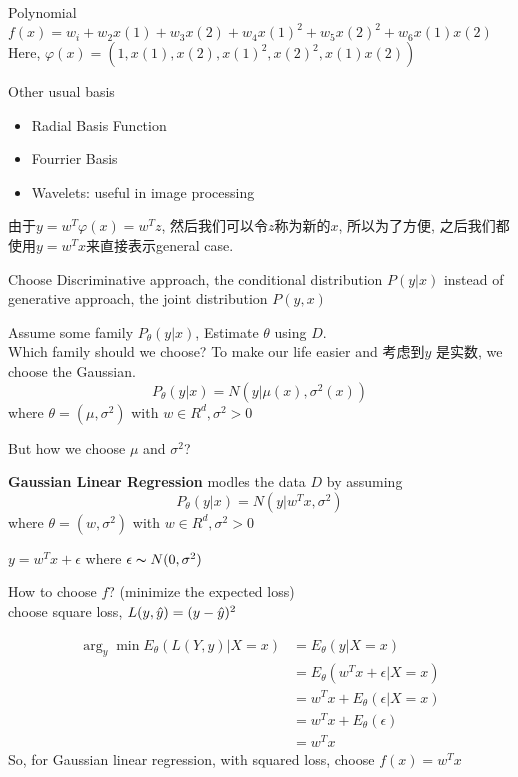 \documentclass{article}
\begin{document}
\begin{example}
Polynomial\\
$f(x) = w_i + w_2 x(1) + w_3 x(2) + w_4 x(1)^2 + w_5 x(2)^2 + w_6 x(1)x(2)$\\
Here, $\varphi(x) = (1, x(1), x(2), x(1)^2, x(2)^2, x(1)x(2))$
\end{example}
Other usual basis
\begin{itemize}
\item Radial Basis Function
\item Fourrier Basis
\item Wavelets: useful in image processing
\end{itemize}

由于$y = w^T \varphi(x) = w^T z$, 然后我们可以令$z$称为新的$x$, 
所以为了方便, 之后我们都使用$y = w^T x$来直接表示general case.

Choose Discriminative approach, the conditional distribution $P(y|x)$ 
instead of generative approach, the joint distribution $P(y,x)$

Assume some family $P_\theta(y|x)$, Estimate $\theta$ using $D$.\\
Which family should we choose? To make our life easier and 考虑到$y$ 是实数, we choose the Gaussian.
$$P_\theta(y|x) = N(y| \mu(x), \sigma^2(x))$$ where $\theta = (\mu, \sigma^2)$ with $w \in R^d, \sigma^2 > 0$

But how we choose $\mu$ and $\sigma^2$?
\begin{definition}
\textbf{Gaussian Linear Regression} modles the data $D$ by assuming 
$$P_\theta(y|x) = N(y| w^T x, \sigma^2)$$ where $\theta = (w, \sigma^2)$ with $w \in R^d, \sigma^2 > 0$

$y = w^T x + \epsilon$ where $\epsilon \thicksim{N}(0, \sigma^2)$
\end{definition}

How to choose $f$? (minimize the expected loss)\\
choose square loss, $L(y, \hat{y}) = (y - \hat{y})^2$

$$
\begin{aligned}
\arg_y \min E_\theta(L(Y,y)|X= x)
& = E_\theta(y|X=x) \\
& = E_\theta(w^T x + \epsilon | X=x) \\
& = w^T x + E_\theta(\epsilon | X=x) \\
& = w^T x + E_\theta(\epsilon) \\
& = w^T x
\end{aligned}
$$
So, for Gaussian linear regression, with squared loss, choose $f(x) = w^T x$
\end{document}
